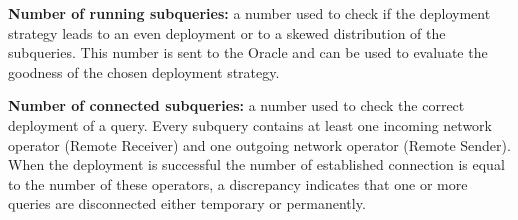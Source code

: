 \textbf{Number of running subqueries:} a number used to check if the deployment strategy leads to an even
deployment or to a skewed distribution of the subqueries. This number is sent to the Oracle and can be
used to evaluate the goodness of the chosen deployment strategy.

\textbf{Number of connected subqueries:} a number used to check the correct deployment of a query.
Every subquery contains at least one incoming network operator (Remote Receiver) and one outgoing network
operator (Remote Sender). When the deployment is successful the number of established connection is equal
to the number of these operators, a discrepancy indicates that one or more queries are disconnected
either temporary or permanently. 


